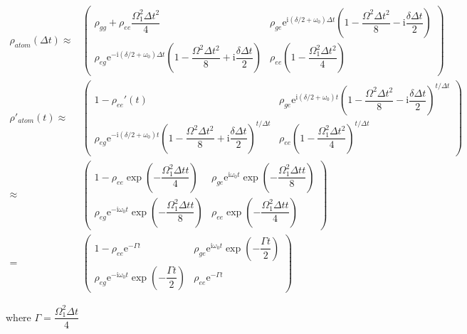 \documentclass[10pt,fleqn]{article}
\newcommand{\ue}{\mathrm{e}}
\newcommand{\ui}{\mathrm{i}}
\newcommand{\eqar}[1]
{
  \begin{align*}
    #1
  \end{align*}
}
\newcommand{\paren}[1]{{\left({#1}\right)}}
\begin{document}
\subsection{}
\eqar{
  \rho_{atom}\paren{\Delta t}\approx&\begin{pmatrix}
    \rho_{gg}+\rho_{ee}\dfrac{\Omega_1^2\Delta t^2}{4}&\rho_{ge}\ue^{\ui\paren{\delta/2+\omega_0}\Delta t}\paren{1-\dfrac{\Omega^2\Delta t^2}{8}-\ui\dfrac{\delta \Delta t}{2}}\\
    \rho_{eg}\ue^{-\ui\paren{\delta/2+\omega_0}\Delta t}\paren{1-\dfrac{\Omega^2\Delta t^2}{8}+\ui\dfrac{\delta \Delta t}{2}}&\rho_{ee}\paren{1-\dfrac{\Omega_1^2\Delta t^2}{4}}
  \end{pmatrix}\\
  \rho'_{atom}\paren{t}\approx&\begin{pmatrix}
    1-\rho_{ee}'\paren{t}&\rho_{ge}\ue^{\ui\paren{\delta/2+\omega_0}t}\paren{1-\dfrac{\Omega^2\Delta t^2}{8}-\ui\dfrac{\delta \Delta t}{2}}^{t/\Delta t}\\
    \rho_{eg}\ue^{-\ui\paren{\delta/2+\omega_0}t}\paren{1-\dfrac{\Omega^2\Delta t^2}{8}+\ui\dfrac{\delta \Delta t}{2}}^{t/\Delta t}&\rho_{ee}\paren{1-\dfrac{\Omega_1^2\Delta t^2}{4}}^{t/\Delta t}
  \end{pmatrix}\\
  \approx&\begin{pmatrix}
    1-\rho_{ee}\exp\paren{-\dfrac{\Omega_1^2\Delta t t}{4}}&\rho_{ge}\ue^{\ui\omega_0t}\exp\paren{-\dfrac{\Omega_1^2\Delta t t}{8}}\\
    \rho_{eg}\ue^{-\ui\omega_0t}\exp\paren{-\dfrac{\Omega_1^2\Delta t t}{8}}&\rho_{ee}\exp\paren{-\dfrac{\Omega_1^2\Delta t t}{4}}
  \end{pmatrix}\\
  =&\begin{pmatrix}
    1-\rho_{ee}\ue^{-\Gamma t}&\rho_{ge}\ue^{\ui\omega_0t}\exp\paren{-\dfrac{\Gamma t}{2}}\\
    \rho_{eg}\ue^{-\ui\omega_0t}\exp\paren{-\dfrac{\Gamma t}{2}}&\rho_{ee}\ue^{-\Gamma t}
  \end{pmatrix}
}
where $\Gamma=\dfrac{\Omega_1^2\Delta t}{4}$
\end{document}
